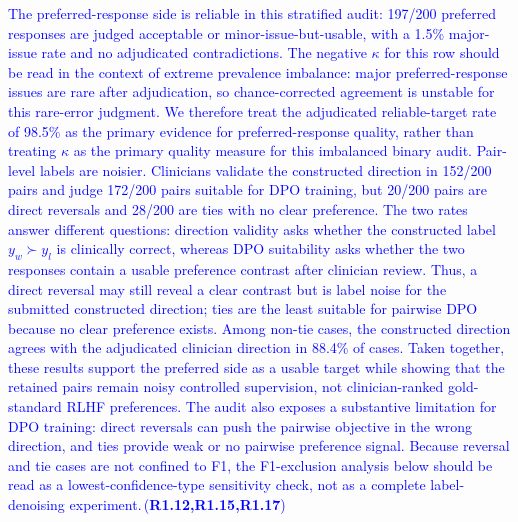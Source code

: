 \documentclass[a4paper,fleqn,doubleblind]{cas-sc}
\DeclareRobustCommand{\added}[1]{\textcolor{blue}{#1}}
\DeclareRobustCommand{\revtag}[1]{\textcolor{blue}{\scriptsize\,(\textbf{#1})}}
\begin{document}
\added{The preferred-response side is reliable in this stratified audit: 197/200 preferred responses are judged acceptable or minor-issue-but-usable, with a 1.5\% major-issue rate and no adjudicated contradictions. The negative $\kappa$ for this row should be read in the context of extreme prevalence imbalance: major preferred-response issues are rare after adjudication, so chance-corrected agreement is unstable for this rare-error judgment. We therefore treat the adjudicated reliable-target rate of 98.5\% as the primary evidence for preferred-response quality, rather than treating $\kappa$ as the primary quality measure for this imbalanced binary audit. Pair-level labels are noisier. Clinicians validate the constructed direction in 152/200 pairs and judge 172/200 pairs suitable for DPO training, but 20/200 pairs are direct reversals and 28/200 are ties with no clear preference. The two rates answer different questions: direction validity asks whether the constructed label $y_w \succ y_l$ is clinically correct, whereas DPO suitability asks whether the two responses contain a usable preference contrast after clinician review. Thus, a direct reversal may still reveal a clear contrast but is label noise for the submitted constructed direction; ties are the least suitable for pairwise DPO because no clear preference exists. Among non-tie cases, the constructed direction agrees with the adjudicated clinician direction in 88.4\% of cases. Taken together, these results support the preferred side as a usable target while showing that the retained pairs remain noisy controlled supervision, not clinician-ranked gold-standard RLHF preferences. The audit also exposes a substantive limitation for DPO training: direct reversals can push the pairwise objective in the wrong direction, and ties provide weak or no pairwise preference signal. Because reversal and tie cases are not confined to F1, the F1-exclusion analysis below should be read as a lowest-confidence-type sensitivity check, not as a complete label-denoising experiment.}\revtag{R1.12,R1.15,R1.17}
\end{document}
